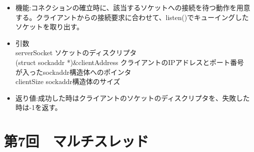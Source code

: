 \documentclass[a4j]{celb-report}
\begin{document}
\begin{enumerate}
\begin{lstlisting}[basicstyle=\ttfamily\footnotesize, frame=single]
  \end{lstlisting}
  \begin{itemize}
   \item 機能:コネクションの確立時に、該当するソケットへの接続を待つ動作を用意する。クライアントからの接続要求に合わせて、listen()でキューイングしたソケットを取り出す。
   \item 引数\\
serverSocket ソケットのディスクリプタ\\
(struct sockaddr *)\&clientAddress クライアントのIPアドレスとポート番号が入ったsockaddr構造体へのポインタ\\
clientSize sockaddr構造体のサイズ
   \item 返り値:成功した時はクライアントのソケットのディスクリプタを、失敗した時は-1を返す。
  \end{itemize}
\end{enumerate}
\newpage
\section{第7回　マルチスレッド}
\end{document}
